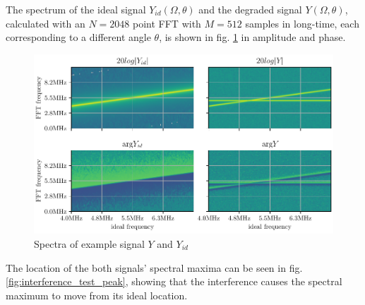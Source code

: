 The spectrum of the ideal signal $Y_{id}(\Omega, \theta)$ and the degraded signal $Y(\Omega,\theta)$,
calculated with an $N=2048$ point FFT with $M=512$ samples in long-time, each corresponding to a different angle $\theta$,
is shown in fig. \ref{fig:interference_test_spectrum} in amplitude and phase.
\begin{figure}
    \centering
    \includegraphics[width=\textwidth]{../figures/interference_test_fft.pdf}
    \caption{Spectra of example signal $Y$ and $Y_{id}$}
    \label{fig:interference_test_spectrum}
\end{figure}
The location of the both signals' spectral maxima can be seen in fig. \ref{fig:interference_test_peak},
showing that the interference causes the spectral maximum to move from its ideal location.
